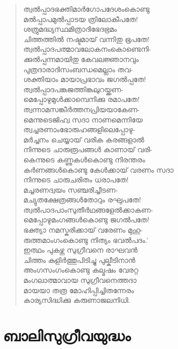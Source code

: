 \begin{verse}
ത്വല്‍പ്പാദഭക്തിമാര്‍ഗോപദേശംകൊണ്ടു\\
മല്‍പ്പാപമുല്‍പ്പാടയ ത്രിലോകീപതേ!\\
ശത്രുമദ്ധ്യസ്ഥമിത്രാദിഭേദഭ്രമം\\
ചിത്തത്തില്‍ നഷ്ടമായ് വന്നിതു ഭൂപതേ!\\
ത്വല്‍പ്പാദപത്മാവലോകനംകൊണ്ടെനി-\\
ക്കുല്‍പ്പന്നമായിതു കേവലജ്ഞാനവും\\
പുത്രദാരാദിസംബന്ധമെല്ലാം തവ-\\
ശക്തിയാം മായാപ്രഭാവം ജഗല്‍പ്പതേ!\\
ത്വല്‍പ്പാദപങ്കജത്തിങ്കലുറയ്ക്കണ-\\
മെപ്പോഴുമുള്‍ക്കാമ്പെനിക്കു രമാപതേ!\\
ത്വന്നാമസങ്കീര്‍ത്തനപ്രിയയാകേണ-\\
മെന്നുടെജിഹ്വ സദാ നാണമെന്നിയേ\\
ത്വച്ചരണാംഭോരുഹങ്ങളിലെപ്പോഴു-\\
മര്‍ച്ചനം ചെയ്യായ് വരിക കരങ്ങളാല്‍\\
നിന്നുടെ ചാരുരൂപങ്ങള്‍ കാണായ് വരി-\\
കെന്നുടെ കണ്ണുകള്‍കൊണ്ടു നിരന്തരം\\
കര്‍ണങ്ങള്‍കൊണ്ടു കേള്‍ക്കായ് വരണം സദാ\\
നിന്നുടെ ചാരുചരിതം ധരാപതേ!\\
മച്ചരണദ്വയം സഞ്ചരിച്ചീടണ-\\
മച്യുതക്ഷേത്രങ്ങള്‍തോറും രഘുപതേ!\\
ത്വല്‍പാദപാംസുതീര്‍ഥങ്ങളേല്‍ക്കാകണ-\\
മെപ്പോഴുമംഗങ്ങള്‍കൊണ്ടു ജഗല്‍പതേ!\\
ഭക്ത്യാ നമസ്കരിക്കായ് വരേണം മുഹു-\\
രുത്തമാംഗംകൊണ്ടു നിത്യം ഭവല്‍പദം.’\\
ഇത്ഥം പുകഴ്ന്ന സുഗ്രീവനെ രാഘവന്‍\\
ചിത്തം കുളിര്‍ത്തുപിടിച്ചു പുല്കീടിനാന്‍\\
അംഗസംഗംകൊണ്ടു കല്മഷം വേരറ്റ\\
മംഗലാത്മാവായ സുഗ്രീവനെത്തദാ\\
മായയാ തത്ര മോഹിപ്പിച്ചിതന്നേരം\\
കാര്യസിദ്ധിക്കു കരുണാജലനിധി.
\end{verse}


\section{ബാലിസുഗ്രീവയുദ്ധം}

